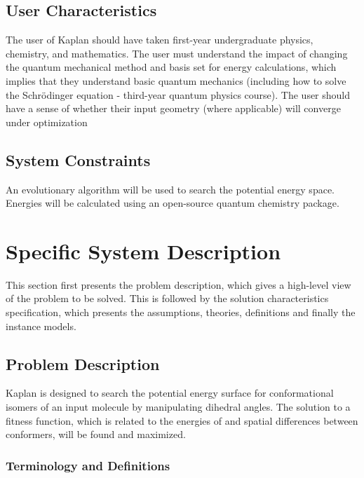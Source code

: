 \documentclass[12pt]{article}
\newcommand{\progname}{Kaplan} %
\begin{document}
\subsection{User Characteristics} \label{SecUserCharacteristics}

The user of \progname{} should have taken first-year undergraduate physics, 
chemistry, and mathematics. The user must understand the 
impact of changing the quantum mechanical method and basis set for energy 
calculations, which implies that they understand basic quantum mechanics 
(including how to solve the Schr\"{o}dinger equation - third-year quantum 
physics 
course). The user should have a sense of whether their input geometry (where 
applicable) will converge under optimization


\subsection{System Constraints}

An evolutionary algorithm will be used to search the potential energy space. 
Energies will be calculated using an open-source quantum chemistry package.

\section{Specific System Description}

This section first presents the problem description, which gives a high-level
view of the problem to be solved.  This is followed by the solution 
characteristics
specification, which presents the assumptions, theories, definitions and finally
the instance models.  

\subsection{Problem Description} \label{Sec_pd}

\progname{} is designed to search the potential energy surface for 
conformational isomers of an input molecule by manipulating dihedral angles. 
The solution to a fitness function, which is related to the energies of and 
spatial differences between conformers, will be found and maximized.

\subsubsection{Terminology and Definitions}
\end{document}
